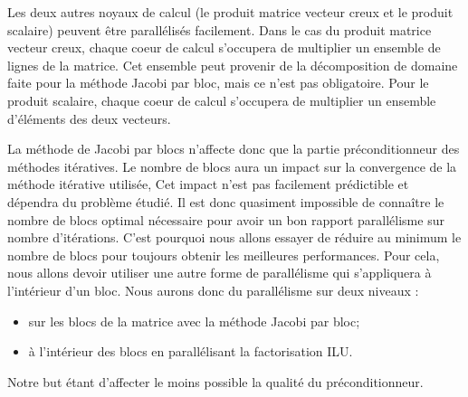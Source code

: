 Les deux autres noyaux de calcul (le produit matrice vecteur creux et le produit scalaire) peuvent être parallélisés facilement.
%
Dans le cas du produit matrice vecteur creux, chaque coeur de calcul s'occupera de multiplier un ensemble de lignes de la matrice.
%
Cet ensemble peut provenir de la décomposition de domaine faite pour la méthode Jacobi par bloc, mais ce n'est pas obligatoire.
%
Pour le produit scalaire, chaque coeur de calcul s'occupera de multiplier un ensemble d'éléments des deux vecteurs.


La méthode de Jacobi par blocs n'affecte donc que la partie préconditionneur des méthodes itératives.
%
Le nombre de blocs aura un impact sur la convergence de la méthode itérative utilisée,
%
Cet impact n'est pas facilement prédictible et dépendra du problème étudié.
%
Il est donc quasiment impossible de connaître le nombre de blocs optimal nécessaire pour avoir un bon rapport parallélisme sur nombre d'itérations.
%
C'est pourquoi nous allons essayer de réduire au minimum le nombre de blocs pour toujours obtenir les meilleures performances.
%
Pour cela, nous allons devoir utiliser une autre forme de parallélisme qui s'appliquera à l'intérieur d'un bloc.
%
Nous aurons donc du parallélisme sur deux niveaux :
\begin{itemize}
  \item sur les blocs de la matrice avec la méthode Jacobi par bloc;
  \item à l'intérieur des blocs en parallélisant la factorisation ILU.
\end{itemize}
%
Notre but étant d'affecter le moins possible la qualité du préconditionneur.
